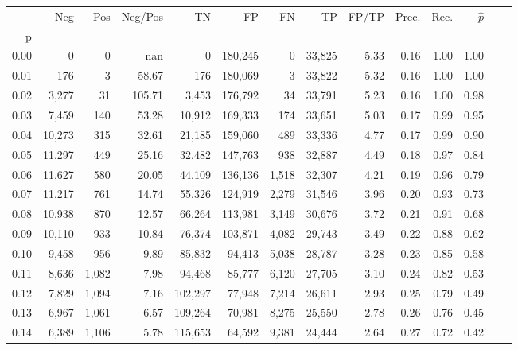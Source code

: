 \begin{tabular}{rrrrrrrrrrrrrr}
\toprule
{} &     Neg &    Pos & Neg/Pos &       TN &       FP &      FN &      TP & FP/TP & Prec. &  Rec. & $\hat{p}$ \\
p    &         &        &         &          &          &         &         &       &       &       &           \\
\midrule
0.00 &       0 &      0 &     nan &        0 &  180,245 &       0 &  33,825 &  5.33 &  0.16 &  1.00 &      1.00 \\
0.01 &     176 &      3 &   58.67 &      176 &  180,069 &       3 &  33,822 &  5.32 &  0.16 &  1.00 &      1.00 \\
0.02 &   3,277 &     31 &  105.71 &    3,453 &  176,792 &      34 &  33,791 &  5.23 &  0.16 &  1.00 &      0.98 \\
0.03 &   7,459 &    140 &   53.28 &   10,912 &  169,333 &     174 &  33,651 &  5.03 &  0.17 &  0.99 &      0.95 \\
0.04 &  10,273 &    315 &   32.61 &   21,185 &  159,060 &     489 &  33,336 &  4.77 &  0.17 &  0.99 &      0.90 \\
0.05 &  11,297 &    449 &   25.16 &   32,482 &  147,763 &     938 &  32,887 &  4.49 &  0.18 &  0.97 &      0.84 \\
0.06 &  11,627 &    580 &   20.05 &   44,109 &  136,136 &   1,518 &  32,307 &  4.21 &  0.19 &  0.96 &      0.79 \\
0.07 &  11,217 &    761 &   14.74 &   55,326 &  124,919 &   2,279 &  31,546 &  3.96 &  0.20 &  0.93 &      0.73 \\
0.08 &  10,938 &    870 &   12.57 &   66,264 &  113,981 &   3,149 &  30,676 &  3.72 &  0.21 &  0.91 &      0.68 \\
0.09 &  10,110 &    933 &   10.84 &   76,374 &  103,871 &   4,082 &  29,743 &  3.49 &  0.22 &  0.88 &      0.62 \\
0.10 &   9,458 &    956 &    9.89 &   85,832 &   94,413 &   5,038 &  28,787 &  3.28 &  0.23 &  0.85 &      0.58 \\
0.11 &   8,636 &  1,082 &    7.98 &   94,468 &   85,777 &   6,120 &  27,705 &  3.10 &  0.24 &  0.82 &      0.53 \\
0.12 &   7,829 &  1,094 &    7.16 &  102,297 &   77,948 &   7,214 &  26,611 &  2.93 &  0.25 &  0.79 &      0.49 \\
0.13 &   6,967 &  1,061 &    6.57 &  109,264 &   70,981 &   8,275 &  25,550 &  2.78 &  0.26 &  0.76 &      0.45 \\
0.14 &   6,389 &  1,106 &    5.78 &  115,653 &   64,592 &   9,381 &  24,444 &  2.64 &  0.27 &  0.72 &      0.42 \\

\end{tabular}
